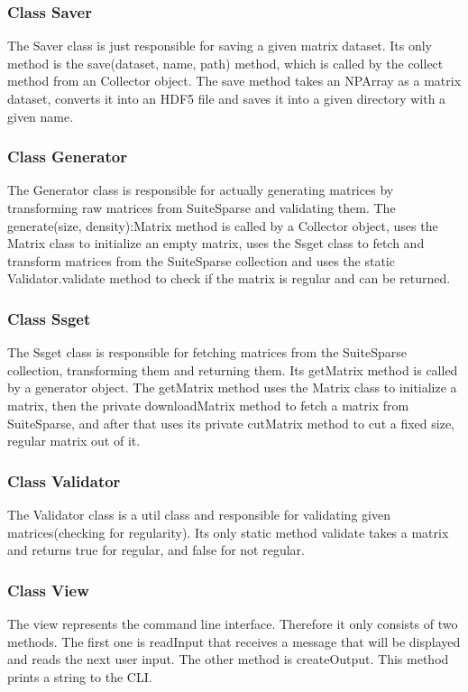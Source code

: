 \documentclass[parskip=full]{scrartcl}
\begin{document}
\subsubsection{Class Saver}
The Saver class is just responsible for saving a given matrix dataset. Its only method is the save(dataset, name, path) method, which
is called by the collect method from an Collector object. The save method takes an NPArray as a matrix dataset, converts it into an HDF5 file and saves it into a given directory with a given name.

\subsubsection{Class Generator}
The Generator class is responsible for actually generating matrices by transforming raw matrices from SuiteSparse and validating them.
The generate(size, density):Matrix method is called by a Collector object, uses the Matrix class to initialize an empty matrix, uses the Ssget class to fetch and transform matrices from the SuiteSparse collection and uses the static Validator.validate method to check if the matrix is regular and can be returned.

\subsubsection{Class Ssget}
The Ssget class is responsible for fetching matrices from the SuiteSparse collection, transforming them and returning them.
Its getMatrix method is called by a generator object. The getMatrix method uses the Matrix class to initialize a matrix, then the private downloadMatrix method to fetch a matrix from SuiteSparse, and after that uses its private cutMatrix method to cut a fixed size, regular matrix out of it.

\subsubsection{Class Validator}
The Validator class is a util class and responsible for validating given matrices(checking for regularity). Its only static method validate takes a matrix and returns true for regular, and false for not regular.

\subsubsection{Class View}
The view represents the command line interface. Therefore it only consists of two methods. The first one is readInput that receives a message that will be displayed and reads the next user input. The other method is createOutput. This method prints a string to the CLI.
\end{document}
